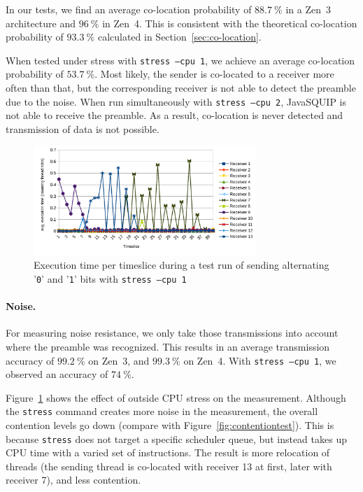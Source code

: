 \documentclass[11pt,
  titlepage=false,
  parskip=half,      %
]{scrreprt}
\begin{document}
In our tests, we find an average co-location probability of $88.7~\%$ in a Zen~3 architecture and $96~\%$ in Zen~4.
This is consistent with the theoretical co-location probability of $93.3~\%$ calculated in Section~\ref{sec:co-location}.

When tested under stress with \texttt{stress --cpu 1}, we achieve an average co-location probability of $53.7~\%$.
Most likely, the sender is co-located to a receiver more often than that,
but the corresponding receiver is not able to detect the preamble due to the noise.
When run simultaneously with \texttt{stress --cpu 2}, JavaSQUIP is not able to receive the preamble.
As a result, co-location is never detected and transmission of data is not possible.

\begin{figure}
    \centering
    \includegraphics[width=0.75\textwidth]{figures/contentiontest_stress}

    \caption{Execution time per timeslice during a test run of sending alternating '\texttt{0}' and '\texttt{1}' bits with \texttt{stress --cpu 1}}
    \label{fig:contentiontest_stress}
\end{figure}

\paragraph{Noise.}
For measuring noise resistance, we only take those transmissions into account where the preamble was recognized.
This results in an average transmission accuracy of $99.2~\%$ on Zen~3, and $99.3~\%$ on Zen~4.
With \texttt{stress --cpu 1}, we observed an accuracy of $74~\%$.

Figure~\ref{fig:contentiontest_stress} shows the effect of outside CPU stress on the measurement.
Although the \texttt{stress} command creates more noise in the measurement, the overall contention levels go down (compare with Figure~\ref{fig:contentiontest}).
This is because \texttt{stress} does not target a specific scheduler queue, but instead takes up CPU time with a varied set of instructions.
The result is more relocation of threads (the sending thread is co-located with receiver 13 at first, later with receiver 7), and less contention.
\end{document}
